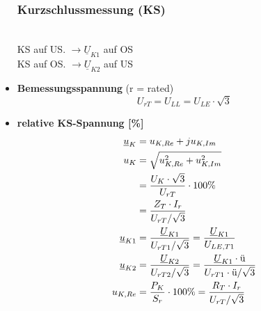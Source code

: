 \begin{itemize}
\subsubsection{Kurzschlussmessung (KS)}\,\\
\setlength\parindent{20pt}\indent KS auf US. $\rightarrow  \underline{U}_{K1}$ auf OS\\
\indent KS auf OS. $\rightarrow \underline{U}_{K2}$ auf US
    \item[]{\textbf{Bemessungsspannung} (r = rated)}
    \[
    U_{rT} = U_{LL} = U_{LE} \cdot \sqrt{3}
    \]

    \item[]{\textbf{relative KS-Spannung [\%]}}
    \begin{align*}
    \underline{u}_K &= u_{K,Re} + j u_{K,Im}\\
        u_K  &= \sqrt{u^2_{K,Re}+u^2_{K,Im}}\\
             &= \frac{U_K\cdot \sqrt{3}}{U_{rT}}\cdot 100\%\\
             &= \frac{Z_T \cdot I_r}{U_{rT}/\sqrt{3}}\\
    \underline{u}_{K1}  &= \frac{\underline{U}_{K1}}{ U_{rT1}/\sqrt{3} } =\frac{\underline{U}_{K1}}{U_{LE,T1}}\\
    \underline{u}_{K2} &= \frac{\underline{U}_{K2}}{ U_{rT2}/\sqrt{3}} = \frac{\underline{U}_{K1} \cdot \textnormal{ü}}{ U_{rT1} \cdot \textnormal{ü}/\sqrt{3}}\\
    u_{K,Re}      &= \frac{P_{K}}{S_{r}}\cdot 100\%=\frac{R_T \cdot I_r}{U_{rT}/\sqrt{3}}
    \end{align*}


\end{itemize}
